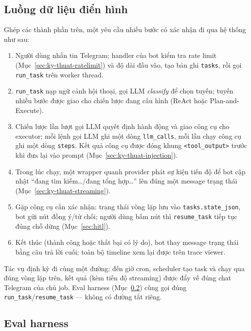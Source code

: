 \subsection{Luồng dữ liệu điển hình}
\label{sec:data-flow}

Ghép các thành phần trên, một yêu cầu nhiều bước có xác nhận đi qua hệ thống
như sau:

\begin{enumerate}
  \item Người dùng nhắn tin Telegram; handler của bot kiểm tra rate limit
        (Mục~\ref{sec:ky-thuat-ratelimit}) và độ dài đầu vào, tạo bản ghi
        \texttt{tasks}, rồi gọi \texttt{run\_task} trên worker thread.
  \item \texttt{run\_task} nạp ngữ cảnh hội thoại, gọi LLM \emph{classify} để
        chọn tuyến; tuyến nhiều bước được giao cho chiến lược đang cấu hình
        (ReAct hoặc Plan-and-Execute).
  \item Chiến lược lần lượt gọi LLM quyết định hành động và giao công cụ cho
        executor; mỗi lệnh gọi LLM ghi một dòng \texttt{llm\_calls}, mỗi lần
        chạy công cụ ghi một dòng \texttt{steps}. Kết quả công cụ được đóng
        khung \texttt{<tool\_output>} trước khi đưa lại vào prompt
        (Mục~\ref{sec:ky-thuat-injection}).
  \item Trong lúc chạy, một wrapper quanh provider phát sự kiện tiến độ để bot
        cập nhật ``đang tìm kiếm\dots/đang tổng hợp\dots'' lên đúng một
        message trạng thái (Mục~\ref{sec:ky-thuat-streaming}).
  \item Gặp công cụ cần xác nhận: trạng thái vòng lặp lưu vào
        \texttt{tasks.state\_json}, bot gửi nút đồng ý/từ chối; người dùng bấm
        nút thì \texttt{resume\_task} tiếp tục đúng chỗ dừng
        (Mục~\ref{sec:hitl}).
  \item Kết thúc (thành công hoặc thất bại có lý do), bot thay message trạng
        thái bằng câu trả lời cuối; toàn bộ timeline xem lại được trên trace
        viewer.
\end{enumerate}

Tác vụ định kỳ đi cùng một đường: đến giờ cron, scheduler tạo task và chạy
qua đúng vòng lặp trên, kết quả (kèm tiến độ streaming) được đẩy về đúng chat
Telegram của chủ job. Eval harness (Mục~\ref{sec:eval-harness}) cũng gọi đúng
\texttt{run\_task}/\texttt{resume\_task} --- không có đường tắt riêng.

\subsection{Eval harness}
\label{sec:eval-harness}

